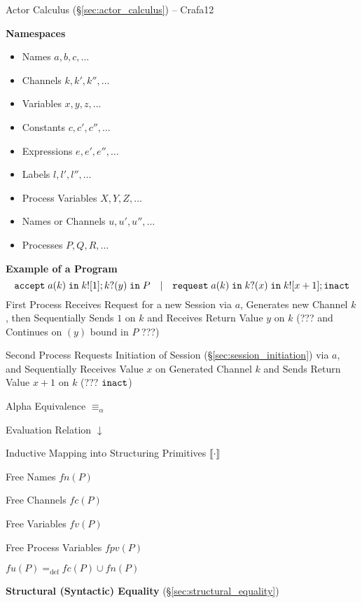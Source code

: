 \fist Actor Calculus (\S\ref{sec:actor_calculus}) -- Crafa12


\asterism


\textbf{Namespaces} \cite{honda-vasconcelos-kubo98}

\begin{itemize}
\item Names $a,b,c,\ldots$
\item Channels $k,k',k'',\ldots$
\item Variables $x,y,z,\ldots$
\item Constants $c,c',c'',\ldots$
\item Expressions $e,e',e'',\ldots$
\item Labels $l,l',l'',\ldots$
\item Process Variables $X,Y,Z,\ldots$
\item Names or Channels $u, u', u'', \ldots$
\item Processes $P,Q,R, \ldots$
\end{itemize}


\textbf{Example of a Program} \cite{honda-vasconcelos-kubo98}
\[
  \mathtt{accept} \; a(k) \; \mathtt{in} \; k![1];
  k?(y) \; \mathtt{in} \; P
  \quad | \quad
  \mathtt{request} \; a(k) \; \mathtt{in} \; k?(x)
  \; \mathtt{in} \; k![x+1]; \mathtt{inact}
\]
First Process Receives Request for a new Session via $a$, Generates
new Channel $k$, then Sequentially Sends $1$ on $k$ and Receives
Return Value $y$ on $k$ (??? and Continues on $(y)$ bound in $P$ ???)

Second Process Requests Initiation of Session
(\S\ref{sec:session_initiation}) via $a$, and Sequentially Receives
Value $x$ on Generated Channel $k$ and Sends Return Value $x + 1$ on
$k$ (??? $\mathtt{inact}$)

Alpha Equivalence $\equiv_\alpha$

Evaluation Relation $\downarrow$

Inductive Mapping into Structuring Primitives $\llbracket \cdot
\rrbracket$

Free Names $fn(P)$

Free Channels $fc(P)$

Free Variables $fv(P)$

Free Process Variables $fpv(P)$

$fu(P) =_{\text{def}} fc(P) \cup fn(P)$


\textbf{Structural (Syntactic) Equality}
(\S\ref{sec:structural_equality})
\cite{honda-vasconcelos-kubo98}

